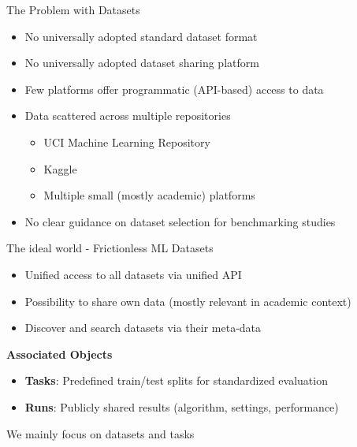 \documentclass[11pt,compress,t,notes=noshow, aspectratio=169, xcolor=table]{beamer}
\begin{document}
\begin{vbframe}{The Problem with Datasets}
\vfill
\begin{itemize}
    \item No universally adopted standard dataset format
    \item No universally adopted dataset sharing platform
    \item Few platforms offer programmatic (API-based) access to data
\end{itemize}
\vfill
\pause
\begin{itemize}
    \item Data scattered across multiple repositories
    \begin{itemize}
        \item UCI Machine Learning Repository
        \item Kaggle
        \item Multiple small (mostly academic) platforms
    \end{itemize}
    \item No clear guidance on dataset selection for benchmarking studies
\end{itemize}
\end{vbframe}

\begin{vbframe}{The ideal world - Frictionless ML}
\vfill
Datasets
\begin{itemize}
    \item Unified access to all datasets via unified API
    \item Possibility to share own data (mostly relevant in academic context)
    \item Discover and search datasets via their meta-data
\end{itemize}
\vfill
\textbf{Associated Objects}
\begin{itemize}
    \item \textbf{Tasks}: Predefined train/test splits for standardized evaluation
    \item \textbf{Runs}: Publicly shared results (algorithm, settings, performance)
\end{itemize}
\vfill
\pause
We mainly focus on datasets and tasks
\end{vbframe}
\end{document}

